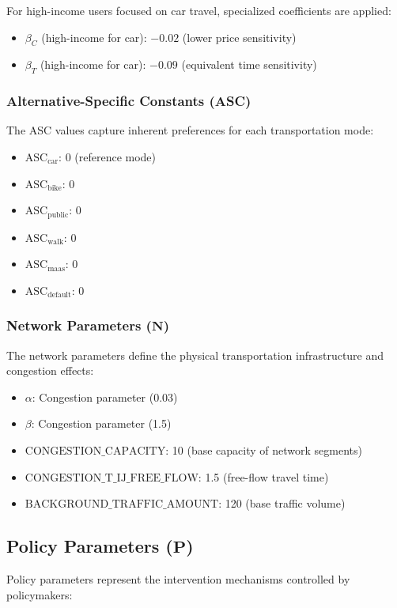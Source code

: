 For high-income users focused on car travel, specialized coefficients are applied:
\begin{itemize}
    \item $\beta_C$ (high-income for car): $-0.02$ (lower price sensitivity)
    \item $\beta_T$ (high-income for car): $-0.09$ (equivalent time sensitivity)
\end{itemize}

\subsubsection{Alternative-Specific Constants (ASC)}
The ASC values capture inherent preferences for each transportation mode:
\begin{itemize}
    \item $\text{ASC}_{\text{car}}$: 0 (reference mode)
    \item $\text{ASC}_{\text{bike}}$: 0
    \item $\text{ASC}_{\text{public}}$: 0
    \item $\text{ASC}_{\text{walk}}$: 0
    \item $\text{ASC}_{\text{maas}}$: 0
    \item $\text{ASC}_{\text{default}}$: 0
\end{itemize}

\subsubsection{Network Parameters \texorpdfstring{($\mathbf{N}$)}{(N)}}
The network parameters define the physical transportation infrastructure and congestion effects:
\begin{itemize}
    \item $\alpha$: Congestion parameter (0.03)
    \item $\beta$: Congestion parameter (1.5)
    \item $\text{CONGESTION\_CAPACITY}$: 10 (base capacity of network segments)
    \item $\text{CONGESTION\_T\_IJ\_FREE\_FLOW}$: 1.5 (free-flow travel time)
    \item $\text{BACKGROUND\_TRAFFIC\_AMOUNT}$: 120 (base traffic volume)
\end{itemize}

\subsection{Policy Parameters \texorpdfstring{($\mathbf{P}$)}{(P)}}
Policy parameters represent the intervention mechanisms controlled by policymakers:

